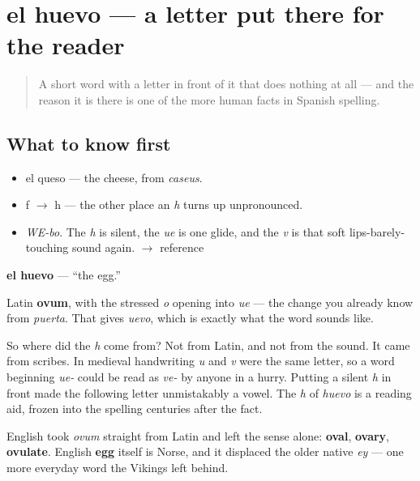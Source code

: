 \section[el huevo]{el huevo — a letter put there for the reader}

\label{lesson:ES-C280-huevo}



\begin{quote}
A short word with a letter in front of it that does nothing at all — and the reason it is there is one of the more human facts in Spanish spelling.
\end{quote}

\subsection*{What to know first}
\begin{itemize}
\raggedright
  \item el queso — the cheese, from \emph{caseus}.
  \item f $\to$ h — the other place an \emph{h} turns up unpronounced.
\end{itemize}

\begin{sounds}
\begin{itemize}
\raggedright
  \item \emph{WE-bo}. The \emph{h} is silent, the \emph{ue} is one glide, and the \emph{v} is that soft lips-barely-touching sound again. $\to$ reference
\end{itemize}
\end{sounds}

\begin{cousinweb}
\textbf{el huevo} — \textquotedblleft{}the egg.\textquotedblright{}

Latin \textbf{ovum}, with the stressed \emph{o} opening into \emph{ue} — the change you already know from \emph{puerta}. That gives \emph{uevo}, which is exactly what the word sounds like.

So where did the \emph{h} come from? Not from Latin, and not from the sound. It came from scribes. In medieval handwriting \emph{u} and \emph{v} were the same letter, so a word beginning \emph{ue-} could be read as \emph{ve-} by anyone in a hurry. Putting a silent \emph{h} in front made the following letter unmistakably a vowel. The \emph{h} of \emph{huevo} is a reading aid, frozen into the spelling centuries after the fact.

English took \emph{ovum} straight from Latin and left the sense alone: \textbf{oval}, \textbf{ovary}, \textbf{ovulate}. English \textbf{egg} itself is Norse, and it displaced the older native \emph{ey} — one more everyday word the Vikings left behind.
\end{cousinweb}

